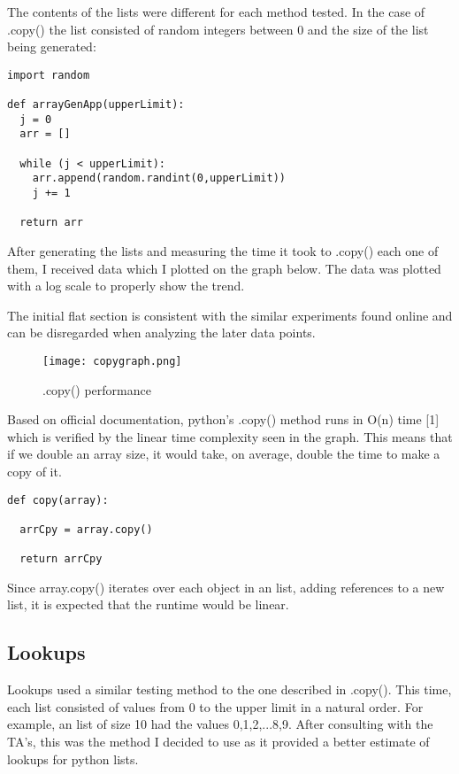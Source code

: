 \documentclass[12pt]{article}
\begin{document}
The contents of the lists were different for each method tested. In the case of .copy() the list consisted of random integers between 0 and the size of the list being generated:

\footnotesize
\begin{verbatim}
import random

def arrayGenApp(upperLimit):
  j = 0
  arr = []

  while (j < upperLimit):
    arr.append(random.randint(0,upperLimit))
    j += 1

  return arr
\end{verbatim}
\normalsize

After generating the lists and measuring the time it took to .copy() each one of them, I received data which I plotted on the graph below. The data was plotted with a log scale to properly show the trend.

The initial flat section is consistent with the similar experiments found online and can be disregarded when analyzing the later data points. 

\begin{figure}[H]
\centering
\texttt{[image: copygraph.png]}
\caption{.copy() performance}
\label{Figure: copygraph}
\end{figure}

Based on official documentation, python's .copy() method runs in O(n) time [1] which is verified by the linear time complexity seen in the graph. This means that if we double an array size, it would take, on average, double the time to make a copy of it. 

\footnotesize
\begin{verbatim}
def copy(array):

  arrCpy = array.copy()

  return arrCpy
\end{verbatim}
\normalsize

Since array.copy() iterates over each object in an list, adding references to a new list, it is expected that the runtime would be linear.

\subsection{Lookups}

Lookups used a similar testing method to the one described in .copy(). This time, each list consisted of values from 0 to the upper limit in a natural order. For example, an list of size 10 had the values 0,1,2,...8,9. After consulting with the TA's, this was the method I decided to use as it provided a better estimate of lookups for python lists.
\end{document}
